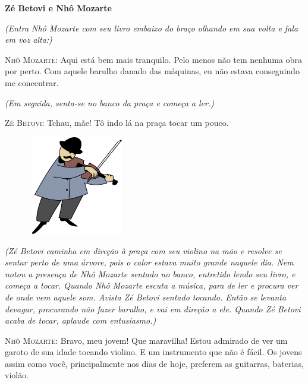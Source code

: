 
\begin{myquote}
\textbf{Zé Betovi e Nhô Mozarte}

\textit{(Entra Nhô Mozarte com seu livro embaixo do braço olhando em
sua volta e fala em voz alta:)}
\vspace{1ex}

\textsc{Nhô Mozarte}: Aqui está bem mais tranquilo. Pelo menos não tem
nenhuma obra por perto. Com aquele barulho danado das máquinas, eu não
estava conseguindo me concentrar.

\vspace{1ex}
\textit{(Em seguida, senta-se no banco da praça e começa a ler.)}
\vspace{1ex}


\textsc{Zé Betovi}: Tchau, mãe! Tô indo lá na praça tocar um pouco.

\begin{figure}
\centering
\includegraphics[width=1.7in,height=1.7in]{./media/image2.png}
\end{figure}

\vspace{1ex}
\textit{(Zé Betovi caminha em
direção à praça com seu violino na mão e resolve se sentar perto de uma
árvore, pois o calor estava muito grande naquele dia. Nem notou a
presença de Nhô Mozarte sentado no banco, entretido lendo seu livro, e
começa a tocar. Quando Nhô Mozarte escuta a música, para de ler e
procura ver de onde vem aquele som. Avista Zé Betovi sentado tocando.
Então se levanta devagar, procurando não fazer barulho, e vai em direção
a ele. Quando Zé Betovi acaba de tocar, aplaude com entusiasmo.)}
\vspace{1ex}

\textsc{Nhô Mozarte}: Bravo, meu jovem! Que maravilha! Estou admirado de
ver um garoto de sua idade tocando violino. E um instrumento que não é
fácil. Os jovens assim como você, principalmente nos dias de hoje,
preferem as guitarras, baterias, violão.


\end{myquote}
